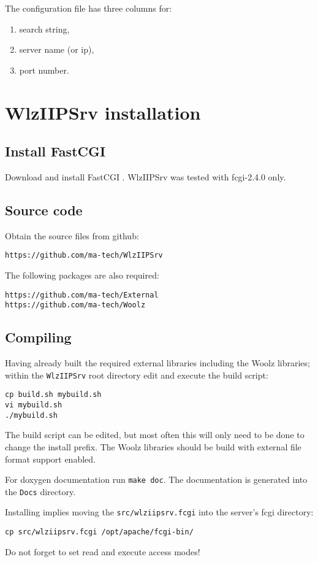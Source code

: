 \documentclass[11pt]{article}
\begin{document}
The configuration file has three columns for:
\begin{enumerate}
\item search string,
\item server name (or ip),
\item port number.
\end{enumerate}


\section{WlzIIPSrv installation}
\label{sec:ref:iipinstall}
\subsection{Install FastCGI}
Download and install FastCGI \cite{LIBFCGI}.
WlzIIPSrv was tested with fcgi-2.4.0 only.


\subsection{Source code}
Obtain the source files from github: 
\begin{verbatim}
https://github.com/ma-tech/WlzIIPSrv
\end{verbatim}

The following packages are also required:
\begin{verbatim}
https://github.com/ma-tech/External
https://github.com/ma-tech/Woolz
\end{verbatim}

\subsection{Compiling}
Having already built the required external libraries including the Woolz
libraries;
within the \texttt{WlzIIPSrv} root directory edit and execute the build script:
\begin{verbatim}
cp build.sh mybuild.sh
vi mybuild.sh
./mybuild.sh
\end{verbatim}

The build script can be edited, but most often this will only
need to be done to change the install prefix.
The Woolz libraries should be build with external file format support
enabled.

For doxygen documentation run \texttt{make doc}.
The documentation is generated into the \texttt{Docs} directory.

Installing implies moving the \texttt{src/wlziipsrv.fcgi} into the server's
fcgi directory:
\begin{verbatim}
cp src/wlziipsrv.fcgi /opt/apache/fcgi-bin/
\end{verbatim}
Do not forget to set read and execute access modes!
\end{document}
